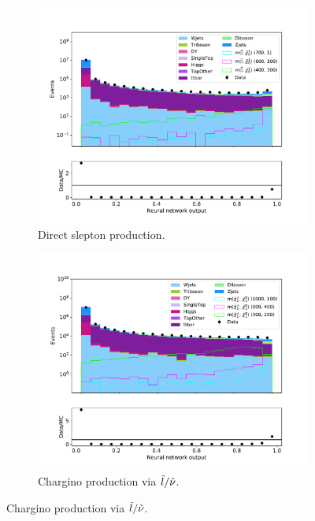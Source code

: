 \begin{figure}[H]
    \centering
    \begin{subfigure}[t!]{0.49\textwidth}
        \includegraphics[width = \textwidth]{Figures/Stacked/stackedplot_NN_High_level_slepslep.pdf}
        \caption{Direct slepton production.}
        \label{fig:SlepslepNNLow}
    \end{subfigure}
    \begin{subfigure}[t!]{0.49\textwidth}
        \includegraphics[width = \textwidth]{Figures/Stacked/stackedplot_NN_High_level_slepsnu.pdf}
        \caption{Chargino production via $\Tilde{l}/\Tilde{\nu}$.}

\end{subfigure}
\end{figure}
